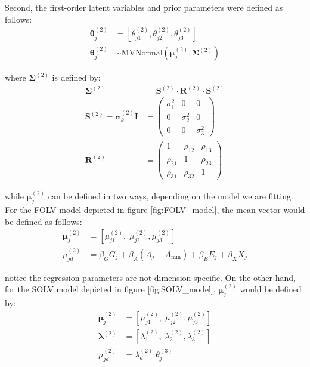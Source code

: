 Second, the first-order latent variables and prior parameters were defined as follows:
%
\begin{align}
	\boldsymbol{\theta}^{(2)}_{j} &= \left[ \theta_{j1}^{(2)}, \theta_{j2}^{(2)}, \theta_{j3}^{(2)} \right] \\
	\boldsymbol{\theta}^{(2)}_{j} &\sim \text{MVNormal} \left( \boldsymbol{\mu}^{(2)}_{j}, \boldsymbol{\Sigma}^{(2)} \right)
\end{align}

where $\boldsymbol{\Sigma}^{(2)}$ is defined by:
%
\begin{align}
	\boldsymbol{\Sigma}^{(2)} &= \boldsymbol{S}^{(2)} \cdot \boldsymbol{R}^{(2)} \cdot \boldsymbol{S}^{(2)} \\
	\boldsymbol{S}^{(2)} = \pmb{\sigma}^{(2)}_{\theta} \mathbf{I} &= 
	\begin{pmatrix}
		\sigma^{2}_{1}	& 0 			 	& 0 				\\
		0 				& \sigma^{2}_{2} 	& 0 				\\
		0 				& 0					& \sigma^{2}_{3} 
	\end{pmatrix} \\
	\boldsymbol{R}^{(2)} &= 
	\begin{pmatrix}
		1			& \rho_{12} & \rho_{13} 	\\
		\rho_{21} 	& 1 		& \rho_{23} 	\\
		\rho_{31} 	& \rho_{32}	& 1	
	\end{pmatrix} 
\end{align}

while $\boldsymbol{\mu}^{(2)}_{j}$ can be defined in two ways, depending on the model we are fitting. For the FOLV model depicted in figure \ref{fig:FOLV_model}, the mean vector would be defined as follows:
%
\begin{align}
	\boldsymbol{\mu}^{(2)}_{j} &= \left[ \mu^{(2)}_{j1}, \; \mu^{(2)}_{j2}, \mu^{(2)}_{j3} \right] \\
	\mu^{(2)}_{jd} &= \beta_{G} G_{j} + \beta_{A} (A_{j} - A_{\text{min}}) + \beta_{E} E_{j} + \beta_{X} X_{j}
\end{align}

notice the regression parameters are not dimension specific. On the other hand, for the SOLV model depicted in figure \ref{fig:SOLV_model}, $\boldsymbol{\mu}^{(2)}_{j}$ would be defined by:
%
\begin{align}
	\boldsymbol{\mu}^{(2)}_{j} &= \left[ \mu^{(2)}_{j1}, \; \mu^{(2)}_{j2}, \mu^{(2)}_{j3} \right] \\
	\pmb{\lambda}^{(2)} &= \left[ \lambda^{(2)}_{1}, \; \lambda^{(2)}_{2}, \lambda^{(2)}_{3} \right] \\
	\mu^{(2)}_{jd} &= \lambda^{(2)}_{d} \; \theta^{(3)}_{j} 
\end{align}

